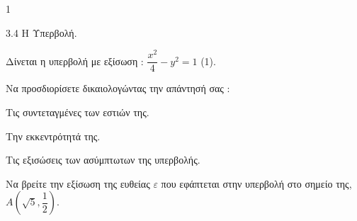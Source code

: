 \begin{ylh}{1}
    \item 3.4 Η Υπερβολή.
\end{ylh}
Δίνεται η υπερβολή με εξίσωση : $\dfrac{x^2}{4} - y^2 = 1$ (1).
\begin{alist}
\item Να προσδιορίσετε δικαιολογώντας την απάντησή σας :
\begin{rlist}
\item Τις συντεταγμένες των εστιών της.
\item Την εκκεντρότητά της.
\item Τις εξισώσεις των ασύμπτωτων της υπερβολής.
\end{rlist} 
\item Να βρείτε την εξίσωση της ευθείας $\varepsilon$ που εφάπτεται στην υπερβολή στο σημείο της, $A\left(\sqrt{5}, \dfrac{1}{2}\right).$ 
\end{alist}